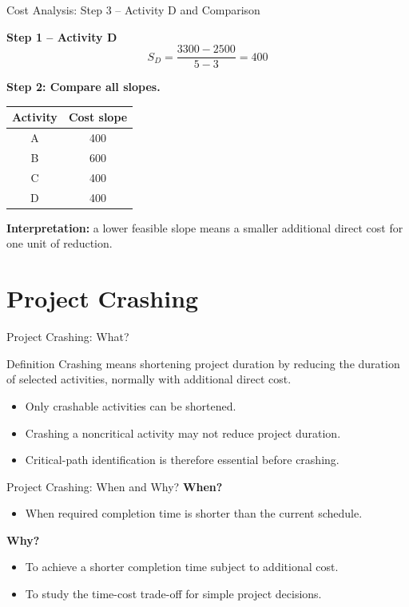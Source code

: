 \documentclass[aspectratio=169,10pt]{beamer}
\begin{document}
\begin{frame}{Cost Analysis: Step 3 -- Activity D and Comparison}
\small
\par\textbf{Step 1 -- Activity D}
\[
S_D=\frac{3300-2500}{5-3}=\boxed{400}
\]
\pause
\par\textbf{Step 2: Compare all slopes.}
\begin{center}
\begin{tabular}{c|c}\toprule Activity & Cost slope\\\midrule A&400\\B&600\\C&400\\D&400\\\bottomrule\end{tabular}
\end{center}
\pause
\textbf{Interpretation:} a lower feasible slope means a smaller additional direct cost for one unit of reduction.
\end{frame}

\section{Project Crashing}

\begin{frame}{Project Crashing: What?}
\begin{block}{Definition}
Crashing means shortening project duration by reducing the duration of selected activities, normally with additional direct cost.
\end{block}
\begin{itemize}
  \item Only crashable activities can be shortened.
  \item Crashing a noncritical activity may not reduce project duration.
  \item Critical-path identification is therefore essential before crashing.
\end{itemize}
\end{frame}

\begin{frame}{Project Crashing: When and Why?}
\textbf{When?}
\begin{itemize}
  \item When required completion time is shorter than the current schedule.
\end{itemize}
\textbf{Why?}
\begin{itemize}
  \item To achieve a shorter completion time subject to additional cost.
  \item To study the time-cost trade-off for simple project decisions.
\end{itemize}
\end{frame}
\end{document}
